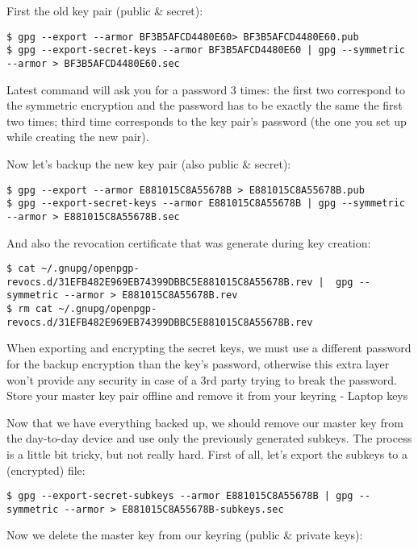 First the old key pair (public \& secret):

\begin{verbatim}
$ gpg --export --armor BF3B5AFCD4480E60> BF3B5AFCD4480E60.pub
$ gpg --export-secret-keys --armor BF3B5AFCD4480E60 | gpg --symmetric --armor > BF3B5AFCD4480E60.sec
\end{verbatim}

Latest command will ask you for a password 3 times: the first two correspond to the symmetric encryption and the password has to be exactly the same the first two times; third time corresponds to the key pair’s password (the one you set up while creating the new pair).

Now let’s backup the new key pair (also public \& secret):

\begin{verbatim}
$ gpg --export --armor E881015C8A55678B > E881015C8A55678B.pub
$ gpg --export-secret-keys --armor E881015C8A55678B | gpg --symmetric --armor > E881015C8A55678B.sec
\end{verbatim}

And also the revocation certificate that was generate during key creation:

\begin{verbatim}
$ cat ~/.gnupg/openpgp-revocs.d/31EFB482E969EB74399DBBC5E881015C8A55678B.rev |  gpg --symmetric --armor > E881015C8A55678B.rev
$ rm cat ~/.gnupg/openpgp-revocs.d/31EFB482E969EB74399DBBC5E881015C8A55678B.rev
\end{verbatim}

When exporting and encrypting the secret keys, we must use a different password for the backup encryption than the key’s password, otherwise this extra layer won’t provide any security in case of a 3rd party trying to break the password.
Store your master key pair offline and remove it from your keyring - Laptop keys

Now that we have everything backed up, we should remove our master key from the day-to-day device and use only the previously generated subkeys. The process is a little bit tricky, but not really hard. First of all, let’s export the subkeys to a (encrypted) file:

\begin{verbatim}
$ gpg --export-secret-subkeys --armor E881015C8A55678B | gpg --symmetric --armor > E881015C8A55678B-subkeys.sec
\end{verbatim}

Now we delete the master key from our keyring (public \& private keys):

